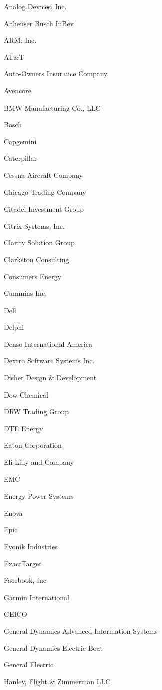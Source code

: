 \documentclass[twoside]{article}
\begin{document}
\begin{center}
\begin{multicols}{5}
\begin{FlushLeft}
\begin{compactitem}
\item Analog Devices, Inc.
\item Anheuser Busch InBev
\item ARM, Inc.
\item AT\&T
\item Auto-Owners Insurance Company
\item Avencore
\item BMW Manufacturing Co., LLC
\item Bosch
\item Capgemini
\item Caterpillar
\item Cessna Aircraft Company
\item Chicago Trading Company
\item Citadel Investment Group
\item Citrix Systems, Inc.
\item Clarity Solution Group
\item Clarkston Consulting
\item Consumers Energy
\item Cummins Inc.
\item Dell
\item Delphi
\item Denso International America
\item Dextro Software Systems Inc.
\item Disher Design \& Development
\item Dow Chemical
\item DRW Trading Group
\item DTE Energy
\item Eaton Corporation
\item Eli Lilly and Company
\item EMC
\item Energy Power Systems
\item Enova
\item Epic
\item Evonik Industries
\item ExactTarget
\item Facebook, Inc
\item Garmin International
\item GEICO
\item General Dynamics Advanced Information Systems
\item General Dynamics Electric Boat
\item General Electric
\item Hanley, Flight \& Zimmerman LLC

\end{compactitem}
\end{FlushLeft}
\end{multicols}
\end{center}
\end{document}

